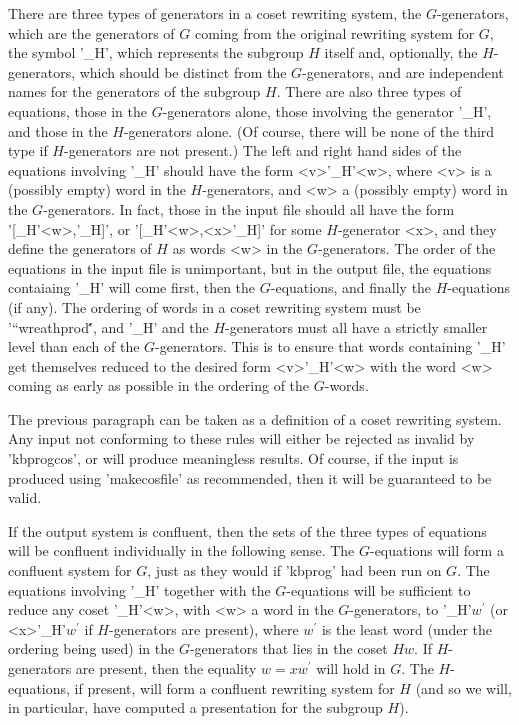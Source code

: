There are three types of generators in a coset rewriting system,
the $G$-generators, which are the generators of $G$ coming from the
original rewriting system for $G$, the symbol '\_H', which represents the
subgroup $H$ itself and, optionally, the $H$-generators, which should be
distinct from the $G$-generators, and are independent names for
the generators of the subgroup $H$.
There are also three types of equations, those in the $G$-generators alone,
those involving the generator '\_H', and those in the $H$-generators alone.
(Of course, there will be none of the third type if $H$-generators are
not present.) The left and right hand sides of the equations involving
'\_H' should have the form <v>'\_H'<w>, where <v> is a (possibly empty)
word in the $H$-generators, and <w> a (possibly empty) word in the
$G$-generators. In fact, those in the input file should all have the
form '[\_H'<w>,'\_H]', or '[\_H'<w>,<x>'\_H]' for some $H$-generator <x>,
and they define the generators of $H$ as words <w> in the $G$-generators.
The order of the equations in the input file is unimportant, but in the
output file, the equations contaiaing '\_H' will come first, then the
$G$-equations, and finally the $H$-equations (if any).
The ordering of words in a coset rewriting system must be '``wreathprod\'\'',
and '\_H' and the $H$-generators must all have a strictly smaller level than
each of the $G$-generators. This is to ensure that words containing
'\_H' get themselves reduced to the desired form <v>'\_H'<w> with the
word <w> coming as early as possible in the ordering of the $G$-words.

The previous paragraph can be taken as a definition of a coset rewriting
system. Any input not conforming to these rules will either be rejected
as invalid by 'kbprogcos', or will produce meaningless results.
Of course, if the input is produced using 'makecosfile' as recommended,
then it will be guaranteed to be valid.

If the output system is confluent, then the sets of the three types of
equations will be confluent individually in the following sense.
The $G$-equations will form a confluent system for $G$, just as they
would if 'kbprog' had been run on $G$. 
The equations involving '\_H' together with the $G$-equations will
be sufficient to reduce any coset '\_H'<w>, with <w> a word in the
$G$-generators, to '\_H'$w^\prime$ (or <x>'\_H'$w^\prime$ if $H$-generators are
present), where $w^\prime$ is the least word (under the ordering being used)
in the $G$-generators that lies in the coset $Hw$. If $H$-generators are
present, then the equality $w = xw^\prime$ will hold in $G$.
The $H$-equations, if present, will form a confluent rewriting system for
$H$ (and so we will, in particular, have computed a presentation for the
subgroup $H$).

